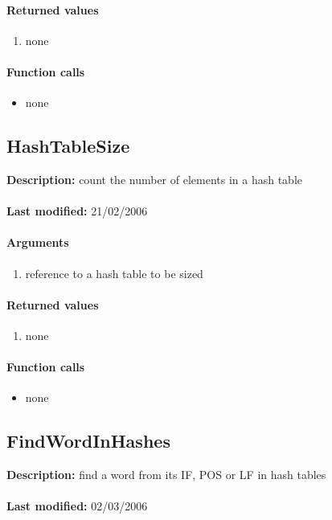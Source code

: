 \paragraph{Returned values}
\begin{enumerate}
\item none
\end{enumerate}

\paragraph{Function calls}
\begin{itemize}
\item none
\end{itemize}

\subsection{HashTableSize}
\textbf{Description:} count the number of elements in a hash table\\
\\\textbf{Last modified:} 21/02/2006

\paragraph{Arguments}
\begin{enumerate}
\item reference to a hash table to be sized
\end{enumerate}

\paragraph{Returned values}
\begin{enumerate}
\item none
\end{enumerate}

\paragraph{Function calls}
\begin{itemize}
\item none
\end{itemize}

\subsection{FindWordInHashes}
\textbf{Description:} find a word from its IF, POS or LF in hash tables\\
\\\textbf{Last modified:} 02/03/2006

